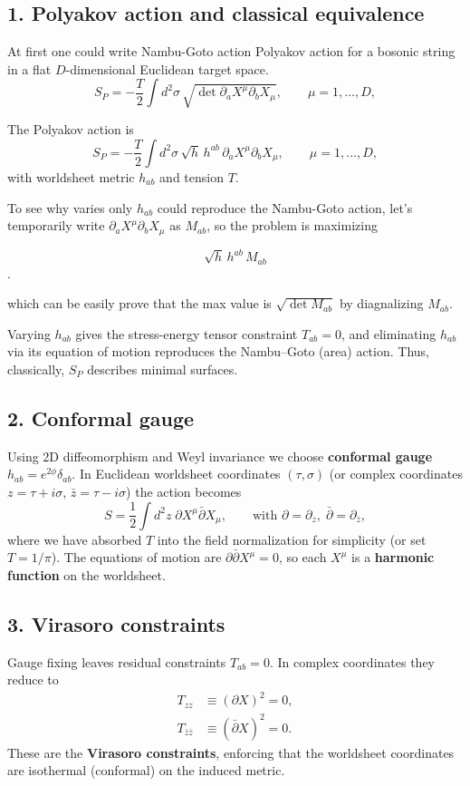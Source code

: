 \subsection*{1. Polyakov action and classical equivalence}
At first one could write Nambu-Goto action Polyakov action for a bosonic string in a flat $D$-dimensional Euclidean target space.
\begin{equation}
S_P = -\frac{T}{2} \int d^2\sigma\,\sqrt{\det \partial_a X^\mu \partial_b X_\mu}, \qquad \mu=1,\dots,D,
\end{equation}

The Polyakov action is
\begin{equation}
S_P = -\frac{T}{2} \int d^2\sigma\,\sqrt{h}\,h^{ab}\,\partial_a X^\mu \partial_b X_\mu, \qquad \mu=1,\dots,D,
\end{equation}
with worldsheet metric $h_{ab}$ and tension $T$. 

To see why varies only $h_{ab}$ could reproduce the Nambu-Goto action, let's temporarily write
$\partial_a X^\mu \partial_b X_\mu$ as $M_{ab}$, so the problem is maximizing 

\[\sqrt{h}\,h^{ab}\,M_{ab}\].  

which can be easily prove that the max value is $\sqrt{\det M_{ab}}$ by diagnalizing $M_{ab}$.

Varying $h_{ab}$ gives the stress-energy tensor constraint $T_{ab}=0$, and eliminating $h_{ab}$ via its equation of motion reproduces the Nambu–Goto (area) action. Thus, classically, $S_P$ describes minimal surfaces.

\subsection*{2. Conformal gauge}
Using 2D diffeomorphism and Weyl invariance we choose \textbf{conformal gauge} $h_{ab}=e^{2\phi}\delta_{ab}$. In Euclidean worldsheet coordinates $(\tau,\sigma)$ (or complex coordinates $z=\tau+i\sigma$, $\bar{z}=\tau-i\sigma$) the action becomes
\begin{equation}
S = \frac{1}{2} \int d^2z \;\partial X^\mu \bar{\partial} X_\mu, \qquad \text{with } \partial = \partial_z,\; \bar{\partial} = \partial_{\bar{z}},
\end{equation}
where we have absorbed $T$ into the field normalization for simplicity (or set $T=1/\pi$). The equations of motion are $\partial\bar{\partial}X^\mu=0$, so each $X^\mu$ is a \textbf{harmonic function} on the worldsheet.

\subsection*{3. Virasoro constraints}
Gauge fixing leaves residual constraints $T_{ab}=0$. In complex coordinates they reduce to
\begin{align}
T_{zz} &\equiv (\partial X)^2 = 0, \label{eq:Tzz}\\
T_{\bar{z}\bar{z}} &\equiv (\bar{\partial} X)^2 = 0. \label{eq:Tzbz}
\end{align}
These are the \textbf{Virasoro constraints}, enforcing that the worldsheet coordinates are isothermal (conformal) on the induced metric.

